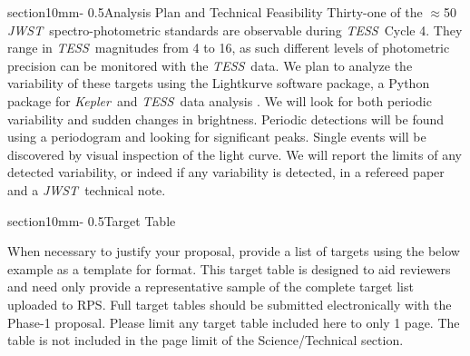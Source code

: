 \documentclass[letterpaper,12pt]{article}
\makeatletter
\renewcommand{\section}{\@startsection%
{section}{1}{0mm}{-\baselineskip}%
{0.5\baselineskip}{\normalfont\Large\bfseries}}%
\newcommand{\tess}{{\it TESS}}
\newcommand{\jwst}{{\it JWST}}
\newcommand{\kepler}{{\it Kepler}}
\makeatother
\begin{document}


\section{Analysis Plan and Technical Feasibility}
Thirty-one of the $\approx$50 \jwst\ spectro-photometric standards are observable during \tess\ Cycle 4.  They range in \tess\ magnitudes from 4 to 16, as such different levels of photometric precision can be monitored with the \tess\ data.  We plan to analyze the variability of these targets using the Lightkurve software package, a Python package for \kepler\ and \tess\ data analysis \citep{2018ascl.soft12013L}. We will look for both periodic variability and sudden changes in brightness. Periodic detections will be found using a periodogram and looking for significant peaks. Single events will be discovered by visual inspection of the light curve. We will report the limits of any detected variability, or indeed if any variability is detected, in a refereed paper and a  \jwst\ technical note.



\clearpage

{}




\section{Target Table}

When necessary to justify your proposal, provide a list of targets using the below example as a template for format. This target table is designed to aid reviewers and need only provide a representative sample of the complete target list uploaded to RPS. Full target tables should be submitted electronically with the Phase-1 proposal. Please limit any target table included here to only 1 page. The table is not included in the page limit of the Science/Technical section. 
\end{document}
